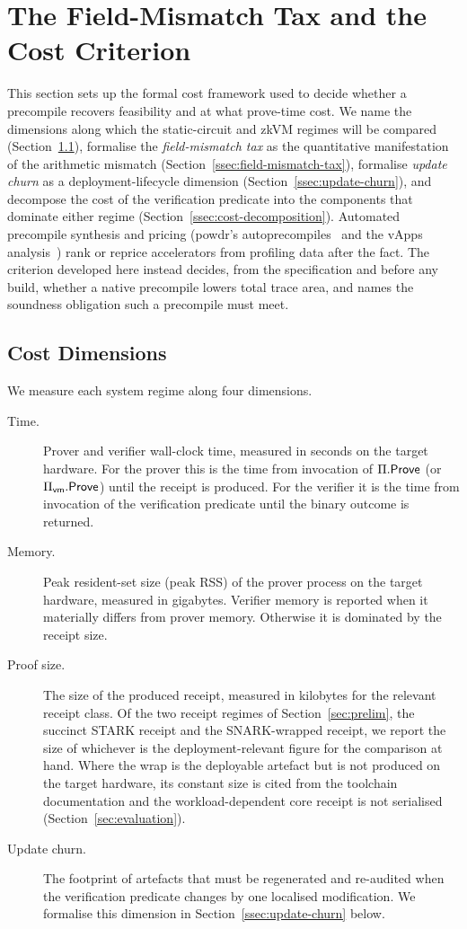 \section{The Field-Mismatch Tax and the Cost Criterion}
\label{sec:theoretical}
This section sets up the formal cost framework used to decide whether a precompile recovers feasibility and at what prove-time cost. We name the dimensions along which the static-circuit and zkVM regimes will be compared (Section~\ref{ssec:cost-dimensions}), formalise the \emph{field-mismatch tax} as the quantitative manifestation of the arithmetic mismatch (Section~\ref{ssec:field-mismatch-tax}), formalise \emph{update churn} as a deployment-lifecycle dimension (Section~\ref{ssec:update-churn}), and decompose the cost of the verification predicate into the components that dominate either regime (Section~\ref{ssec:cost-decomposition}). Automated precompile synthesis and pricing (powdr's autoprecompiles~\cite{powdr2025autoprecompiles} and the vApps analysis~\cite{vapps2025}) rank or reprice accelerators from profiling data after the fact. The criterion developed here instead decides, from the specification and before any build, whether a native precompile lowers total trace area, and names the soundness obligation such a precompile must meet.

\subsection{Cost Dimensions}\label{ssec:cost-dimensions}
We measure each system regime along four dimensions.

\begin{description}
  \item[Time.] Prover and verifier wall-clock time, measured in seconds on the target hardware. For the prover this is the time from invocation of $\Pi.\mathsf{Prove}$ (or $\Pi_{\mathsf{vm}}.\mathsf{Prove}$) until the receipt is produced. For the verifier it is the time from invocation of the verification predicate until the binary outcome is returned.
  \item[Memory.] Peak resident-set size (peak RSS) of the prover process on the target hardware, measured in gigabytes. Verifier memory is reported when it materially differs from prover memory. Otherwise it is dominated by the receipt size.
  \item[Proof size.] The size of the produced receipt, measured in kilobytes for the relevant receipt class. Of the two receipt regimes of Section~\ref{sec:prelim}, the succinct STARK receipt and the SNARK-wrapped receipt, we report the size of whichever is the deployment-relevant figure for the comparison at hand. Where the wrap is the deployable artefact but is not produced on the target hardware, its constant size is cited from the toolchain documentation and the workload-dependent core receipt is not serialised (Section~\ref{sec:evaluation}).
  \item[Update churn.] The footprint of artefacts that must be regenerated and re-audited when the verification predicate changes by one localised modification. We formalise this dimension in Section~\ref{ssec:update-churn} below.
\end{description}


